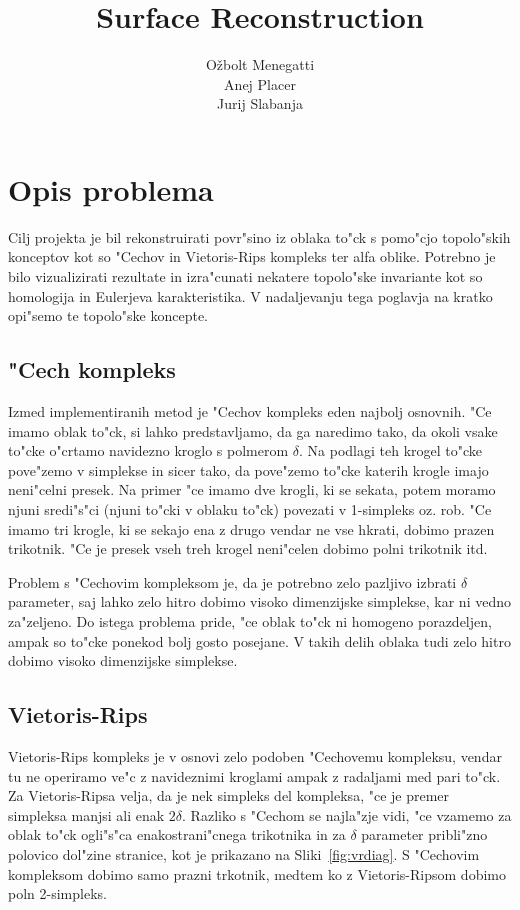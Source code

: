 \documentclass[11pt]{article}
\title{\textbf{Surface Reconstruction}}
\author{O\v zbolt Menegatti\\
		Anej Placer\\
		Jurij Slabanja}
\date{}
\begin{document}
\maketitle

\section{Opis problema}

Cilj projekta je bil rekonstruirati povr"sino iz oblaka to"ck s pomo"cjo topolo"skih konceptov kot so "Cechov in Vietoris-Rips kompleks ter alfa oblike. Potrebno je bilo vizualizirati rezultate in izra"cunati nekatere topolo"ske invariante kot so homologija in Eulerjeva karakteristika. V nadaljevanju tega poglavja na kratko opi"semo te topolo"ske koncepte.

\subsection{"Cech kompleks}
Izmed implementiranih metod je "Cechov kompleks eden najbolj osnovnih. "Ce imamo oblak to"ck, si lahko predstavljamo, da ga naredimo tako, da okoli vsake to"cke o"crtamo navidezno kroglo s polmerom $\delta$. Na podlagi teh krogel to"cke pove"zemo v simplekse in sicer tako, da pove"zemo to"cke katerih krogle imajo neni"celni presek. Na primer "ce imamo dve krogli, ki se sekata, potem moramo njuni sredi"s"ci (njuni to"cki v oblaku to"ck) povezati v 1-simpleks oz. rob. "Ce imamo tri krogle, ki se sekajo ena z drugo vendar ne vse hkrati, dobimo prazen trikotnik. "Ce je presek vseh treh krogel neni"celen dobimo polni trikotnik itd. 

Problem s "Cechovim kompleksom je, da je potrebno zelo pazljivo izbrati $\delta$ parameter, saj lahko zelo hitro dobimo visoko dimenzijske simplekse, kar ni vedno za"zeljeno. Do istega problema pride, "ce oblak to"ck ni homogeno porazdeljen, ampak so to"cke ponekod bolj gosto posejane. V takih delih oblaka tudi zelo hitro dobimo visoko dimenzijske simplekse.

\subsection{Vietoris-Rips}
Vietoris-Rips kompleks je v osnovi zelo podoben "Cechovemu kompleksu, vendar tu ne operiramo ve"c z navideznimi kroglami ampak z radaljami med pari to"ck. Za Vietoris-Ripsa velja, da je nek simpleks del kompleksa, "ce je premer simpleksa manjsi ali enak $2\delta$. Razliko s "Cechom se najla"zje vidi, "ce vzamemo za oblak to"ck ogli"s"ca enakostrani"cnega trikotnika in za $\delta$ parameter pribli"zno polovico dol"zine stranice, kot je prikazano na Sliki~\ref{fig:vrdiag}. S "Cechovim kompleksom dobimo samo prazni trkotnik, medtem ko z Vietoris-Ripsom dobimo poln 2-simpleks.
\end{document}
